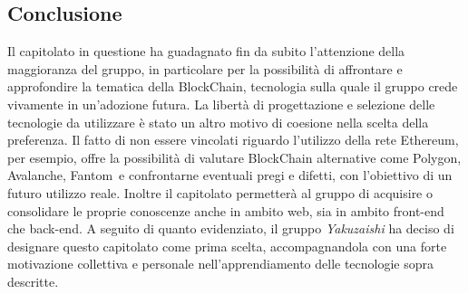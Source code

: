 \subsection{Conclusione}
Il capitolato in questione ha guadagnato fin da subito l'attenzione della maggioranza del gruppo, in particolare per la possibilità di affrontare e approfondire la tematica della BlockChain\glo{}, tecnologia sulla quale il gruppo crede vivamente in un'adozione futura.
La libertà di progettazione e selezione delle tecnologie da utilizzare è stato un altro motivo di coesione nella scelta della preferenza. Il fatto di non essere vincolati riguardo l'utilizzo della rete Ethereum, per esempio, offre la possibilità di valutare BlockChain\glo{}
alternative come Polygon\glo, Avalanche\glo, Fantom\glo\ e confrontarne eventuali pregi e difetti, con l'obiettivo di un futuro utilizzo reale.
\newline
Inoltre il capitolato permetterà al gruppo di acquisire o consolidare le proprie conoscenze anche in ambito web, sia in ambito front-end che back-end. A seguito di quanto evidenziato, il gruppo \textit{Yakuzaishi} ha deciso di designare questo capitolato come prima scelta,
accompagnandola con una forte motivazione collettiva e personale nell'apprendiamento delle tecnologie sopra descritte.
